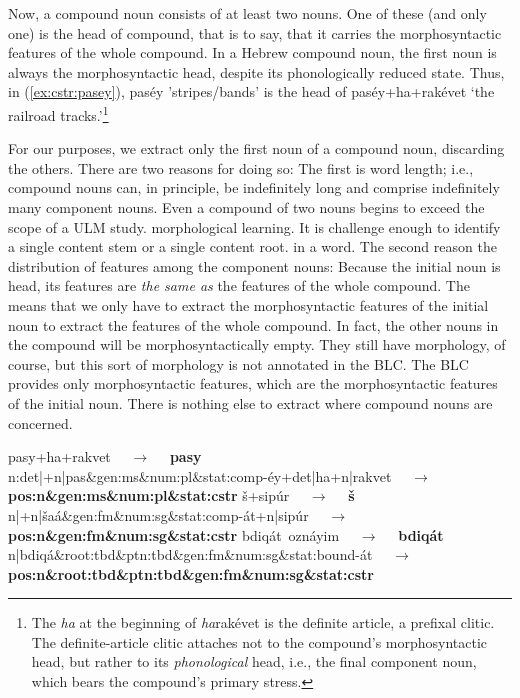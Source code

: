 Now, a compound noun consists of at least two nouns. One of these 
(and only one) is the head of compound, that is to say, that it carries 
the morphosyntactic features of the whole compound. In a Hebrew compound 
noun, the first noun
is always the morphosyntactic head, despite its phonologically 
reduced state.
Thus, in (\ref{ex:cstr:pasey}), \textsf{pas\'{e}y} 'stripes/bands' 
is the head of \textsf{pas\'{e}y+ha+rak\'{e}vet} `the railroad 
tracks.'\footnote{The \textit{ha} at the beginning of  
\textsf{\textit{ha}rak\'{e}vet} is the definite article, a prefixal 
clitic. The definite-article clitic attaches not to the compound's 
morphosyntactic head, but rather to its \emph{phonological} head, 
i.e., the final component noun, which bears the compound's primary stress.}

For our purposes, we extract only the first noun of a compound noun, 
discarding the others. 
There are two reasons for doing so:
The first is word length; 
i.e., compound nouns can, in principle, be indefinitely long and comprise
indefinitely many component nouns.
Even a compound of two nouns begins to exceed the scope 
of a ULM study. morphological learning. It is challenge enough 
to identify a single 
content stem or a single content root.  in a word. 
The second reason the distribution of features among the 
component nouns: Because the initial noun is head, its 
features are \emph{the same as} the features of the whole compound. 
The means that we only have to extract the morphosyntactic 
features of the initial noun to extract the features of the whole 
compound. In fact, the other nouns in the compound will be 
morphosyntactically empty. They still have morphology, of course, 
but this sort of morphology is not annotated in 
the \ac{BLC}. The \ac{BLC} provides only morphosyntactic 
features, which are the morphosyntactic features of the initial 
noun. There is nothing else to extract where compound nouns 
are concerned.

\begin{exe}
\ex \label{ex:cstr:pasey2}
	\textsf{pasy+ha+rakvet} $\quad\to\quad$ 
	\textbf{\textsf{pasy}} \\
	\textsf{n:det|+n|pas\&gen:ms\&num:pl\&stat:comp-\'{e}y+det|ha+n|rakvet} $\quad\to\quad$ \\
	\textbf{\textsf{pos:n\&gen:ms\&num:pl\&stat:cstr}}
\ex \label{ex:cstr:shaat2} 
	\textsf{\v{s}+sip\'{u}r} $\quad\to\quad$ \textbf{\textsf{\v{s}}}\\
	\textsf{n|+n|\v{s}a\'a\&gen:fm\&num:sg\&stat:comp-\'at+n|sip\'ur} $\quad\to\quad$ \\
	\textbf{\textsf{pos:n\&gen:fm\&num:sg\&stat:cstr}}
\ex \label{ex:cstr:bdiqat2} 
	\textsf{bdiq\'{a}t\, ozn\'{a}yim} $\quad\to\quad$ \textbf{\textsf{\textsf{bdiq\'{a}t}}} \\ 
	\textsf{n|bdiq\'{a}\&root:tbd\&ptn:tbd\&gen:fm\&num:sg\&stat:bound-\'{a}t} $\quad\to\quad$ \\
	\textbf{\textsf{pos:n\&root:tbd\&ptn:tbd\&gen:fm\&num:sg\&stat:cstr}}
\end{exe}

